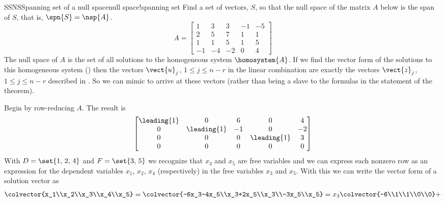 \begin{example}{SSNS}{Spanning set of a null space}{null space!spanning set}
Find a set of vectors, $S$, so that the null space of the matrix $A$ below is the span of $S$, that is, $\spn{S}=\nsp{A}$.
%
\begin{equation*}
A=
\begin{bmatrix}
 1 & 3 & 3 & -1 & -5\\
 2 & 5 & 7 & 1 & 1\\
 1 & 1 & 5 & 1 & 5\\
 -1 & -4 & -2 & 0 & 4
\end{bmatrix}
\end{equation*}
%
The null space of $A$ is the set of all solutions to the homogeneous system $\homosystem{A}$.  If we find the vector form of the solutions to this homogeneous system () then the vectors $\vect{u}_j$, $1\leq j\leq n-r$ in the linear combination are exactly the vectors $\vect{z}_j$, $1\leq j\leq n-r$ described in .  So we can mimic  to arrive at these vectors (rather than being a slave to the formulas in the statement of the theorem).\par
%
Begin by row-reducing $A$.  The result is
%
\begin{equation*}
\begin{bmatrix}
\leading{1} & 0 & 6 & 0 & 4\\
0 & \leading{1} & -1 & 0 & -2\\
0 & 0 & 0 & \leading{1} & 3\\
0 & 0 & 0 & 0 & 0
\end{bmatrix}
\end{equation*}
%
With $D=\set{1,\,2,\,4}$ and $F=\set{3,\,5}$ we recognize that $x_3$ and $x_5$ are free variables and we can express each nonzero row as an expression for the dependent variables $x_1$, $x_2$, $x_4$ (respectively) in the free variables $x_3$ and $x_5$.  With this we can write the vector form of a solution vector as
%
\begin{equation*}
\colvector{x_1\\x_2\\x_3\\x_4\\x_5}=
\colvector{-6x_3-4x_5\\x_3+2x_5\\x_3\\-3x_5\\x_5}=
x_3\colvector{-6\\1\\1\\0\\0}+

\end{equation*}
\end{example}
